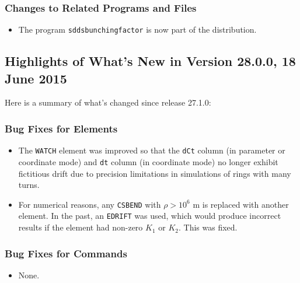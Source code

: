 \documentclass[11pt]{article}
\begin{document}
\subsubsection{Changes to Related Programs and Files}

\begin{itemize}
\item The program \verb|sddsbunchingfactor| is now part of the distribution.
\end{itemize}

\subsection{Highlights of What's New in Version 28.0.0, 18 June 2015}

Here is a summary of what's changed since release 27.1.0:

\subsubsection{Bug Fixes for Elements}

\begin{itemize}
\item The \verb|WATCH| element was improved so that the \verb|dCt| column (in parameter or coordinate mode) and \verb|dt| column (in coordinate mode)
  no longer exhibit fictitious drift due to precision limitations in simulations of rings with many turns.
\item For numerical reasons, any \verb|CSBEND| with $\rho>10^6$ m is replaced with another element. In the past, an \verb|EDRIFT| was used,
  which would produce incorrect results if the element had non-zero $K_1$ or $K_2$. This was fixed. 
\end{itemize}

\subsubsection{Bug Fixes for Commands}
\begin{itemize}
\item None.
\end{itemize}
\end{document}
